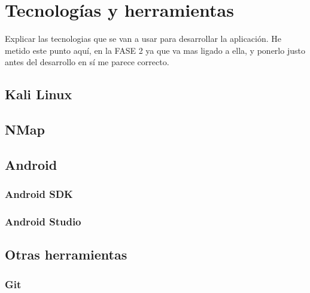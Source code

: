 \chapter{Tecnologías y herramientas}

{\color{red} Explicar las tecnologias que se van a usar para desarrollar la aplicación. He metido este punto aquí, en la FASE 2 ya que va mas ligado a ella, y ponerlo justo antes del desarrollo en sí me parece correcto.}

\section{Kali Linux}


\section{NMap}


\section{Android}

\subsection{Android SDK}

\subsection{Android Studio}


\section{Otras herramientas}

\subsection{Git}